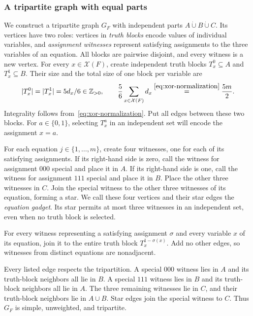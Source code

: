 \subsubsection{A tripartite graph with equal parts}

We construct a tripartite graph $G_F$ with independent parts
$A\mathbin{\dot\cup}B\mathbin{\dot\cup}C$. Its vertices have two
roles: vertices in \emph{truth blocks} encode values of individual
variables, and \emph{assignment witnesses} represent satisfying
assignments to the three variables of an equation. All blocks are
pairwise disjoint, and every witness is a new vertex.
For every $x\in\mathcal X(F)$, create independent truth blocks
$T_x^0\subseteq A$ and $T_x^1\subseteq B$. Their size and the total
size of one block per variable are
\begin{equation}\label{eq:xor-truth-budget}
 |T_x^0|=|T_x^1|=5d_x/6\in\mathbb Z_{>0},\qquad \frac56\sum_{x\in\mathcal X(F)}d_x
 \overset{\eqref{eq:xor-normalization}}{=}\frac{5m}{2}.
\end{equation}
Integrality follows from~\eqref{eq:xor-normalization}. Put all edges
between these two blocks. For $a\in\{0,1\}$, selecting $T_x^a$ in an
independent set will encode the assignment $x=a$.

For each equation $j\in\{1,\ldots,m\}$, create four witnesses, one for
each of its satisfying assignments. If its right-hand side is zero, call the
witness for assignment $000$ special and place it in $A$. If its
right-hand side is one, call the witness for assignment $111$ special
and place it in $B$. Place the other three witnesses in $C$. Join the
special witness to the other three witnesses of its equation, forming
a star. We call these four vertices and their star edges the
\emph{equation gadget}. Its star permits at most three witnesses
in an independent set, even when no truth block is selected.

For every witness representing a satisfying assignment $\sigma$ and
every variable $x$ of its equation, join it to the entire truth block
$T_x^{1-\sigma(x)}$. Add no other edges, so witnesses from distinct
equations are nonadjacent.

Every listed edge respects the tripartition. A special $000$ witness
lies in $A$ and its truth-block neighbors all lie in $B$. A special
$111$ witness lies in $B$ and its truth-block neighbors all lie in
$A$. The three remaining witnesses lie in $C$, and their truth-block
neighbors lie in $A\cup B$. Star edges join the special witness to
$C$. Thus $G_F$ is simple, unweighted, and tripartite.

